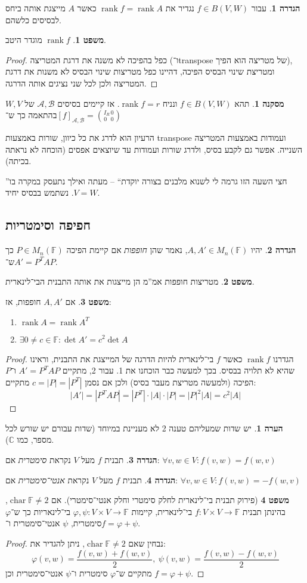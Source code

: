 \documentclass[a4paper]{article}
\newcommand\C     {\mathbb{C}}
\newcommand\ac    {\mathcal{A}}
\newcommand\bc    {\mathcal{B}}
\DeclareMathOperator{\chr}     {char}
\DeclareMathOperator{\rk}      {rank}
\newcommand\F         {\mathbb{F}}
\newcommand\co        {\colon}
\newcommand\sof[1]    {\left | #1 \right |}
\renewcommand\phi     {\varphi}
\theoremstyle{definition}
\newtheorem{Theorem}{\color{myblue}משפט}
\newtheorem{Definition}{\color{mygreen}הגדרה}
\newtheorem{Remark}{\color{mycyan}הערה}
\newtheorem{Collary}{\color{mymagenta}מסקנה}
\newcommand\cola [1] {\begin{Collary}#1\end{Collary}}
\newcommand\theo  [1] {\begin{Theorem}#1\end{Theorem}}
\newcommand\defi  [1] {\begin{Definition}#1\end{Definition}}
\newcommand\rmark [1] {\begin{Remark}#1\end{Remark}}
\begin{document}
	\defi{עבור $f \in B(V, W)$ נגדיר את $\rk f = \rk A$ כאשר $A$ מייצגת אותה ביחס לבסיסים כלשהם. }
	\theo{$\rk f$ מוגדר היטב. }
	\begin{proof}
		כפל בהפיכה לא משנה את דרגת המטריצה (ו־transpose של מטריצה הוא הפיך), ומטריצת שינוי הבסיס הפיכה, דהיינו כפל מטריצות שינוי הבסיס לא משנות את דרגת המטריצה ולכן לכל שני נציגים אותה הדרגה. 
	\end{proof}
	
	\cola{תהא $f \in B(V, W)$ ונניח $\rk f = r$. אז קיימים בסיסים $\ac, \bc$ של $W, V$ בהתאמה כך ש־$[f]_{\ac, \bc} = \binom{I_R \, 0}{0\,\,\,\, 0}$}
	הרעיון הוא לדרג את כל כיוון, שורות באמצעות transpose ועמודות באמצעות המטריצה השנייה. אפשר גם לקבע בסיס, ולדרג שורות ועמודות עד שיוצאים אפסים (הוכחה לא נראתה בכיתה). 
	
	''חצי השעה הזו גרמה לי לשנוא מלבנים בצורה יוקדת`` – מעתה ואילך נתעסק במקרה בו $V = W$. נשתמש בבסיס יחיד. 
	
	\subsection{חפיפה וסימטריות}
	\defi{יהיו $A, A' \in M_n(\F)$, נאמר שהן \textit{חופפות} אם קיימת הפיכה $P \in M_n(\F)$ כך ש־$A' = P^TAP$. }
	\theo{מטריצות חופפות אמ''מ הן מייצגות את אותה התבנית הבי־לינארית. }
	\theo{אם $A, A'$ חופפות, אז: 
		\begin{enumerate}
			\item \hfil $\rk A = \rk A^T$
			\item \hfil $\exists 0 \neq c \in \F \co \det A' = c^2 \det A$
	\end{enumerate}}
	\begin{proof}
		הגדרנו $\rk f$ כאשר $f$ בי־לינארית להיות הדרגה של המייצגת את התבנית, וראינו שהיא לא תלויה בבסיס. בכך למעשה כבר הוכחנו את 1. עבור 2, מתקיים $A' = P^TAP$ ו־$P$ הפיכה (ולמעשה מטריצת מעבר בסיס) ולכן אם נסמן $c = |P| = |P^T|$ מתקיים: 
		\[ |A'| = |P^TAP| = |P^T| \cdot |A| \cdot |P| = \sof{P}^2\sof{A} = c^2 |A| \]
	\end{proof}
	\rmark{יש שדות שמעליהם טענה 2 לא מעניינת במיוחד (שדות עבורם יש שורש לכל מספר, כמו $\C$). }
	
	\defi{תבנית $f$ מעל $V$ נקראת \textit{סימטרית} אם: \hfill $\forall v, w \in V \co f(v, w) = f(w, v)$}
	\defi{תבנית $f$ מעל $V$ נקראת \textit{אנטי־סימטרית} אם: \hfill $\forall v, w \in V \co f(v, w) = -f(w, v)$}
	\begin{Theorem}[פירוק תבנית בי־לינארית לחלק סימטרי וחלק אנטי־סימטרי]
		אם $\chr \F \neq 2$, בהינתן תבנית $f \co V \times V \to \F$ בי־לינארית, קיימות $\phi, \psi \co V\times V \to \F$ בי־לינאריות כך ש־$\phi$ סימטרית, $\psi$ אנטי־סימטרית ו־$f = \phi + \psi$. 
	\end{Theorem}
	\begin{proof}
		נבחין שאם $\chr \F \neq 2$, ניתן להגדיר את: 
		\[ \phi(v, w) = \frac{f(v, w) + f(w, v)}{2}, \ \psi(v, w) = \frac{f(v, w) - f(w, v)}{2} \]
		מתקיים ש־$\phi$ סימטרית ו־$\psi$ אנטי־סימטרית וכן $f = \phi + \psi$. 
	\end{proof}
	
\end{document}
